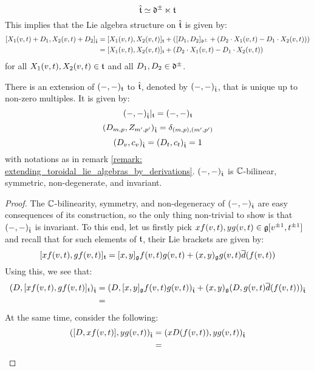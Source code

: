 \begin{remark}
                    $$\hat{\mathfrak{t}} \simeq \mathfrak{d}^{\pm} \ltimes \mathfrak{t}$$
                This implies that the Lie algebra structure on $\hat{\mathfrak{t}}$ is given by:
                    $$
                        \begin{aligned}
                            [ X_1(v, t) + D_1, X_2(v, t) + D_2 ]_{\hat{\t}} & = [X_1(v, t), X_2(v, t)]_{\t} + ( [D_1, D_2]_{\d^{\pm}} + ( D_2 \cdot X_1(v, t) - D_1 \cdot X_2(v, t) ) )
                            \\
                            & = [X_1(v, t), X_2(v, t)]_{\t} + ( D_2 \cdot X_1(v, t) - D_1 \cdot X_2(v, t) )
                        \end{aligned}
                    $$
                for all $X_1(v, t), X_2(v, t) \in \mathfrak{t}$ and all $D_1, D_2 \in \mathfrak{d}^{\pm}$.
            \end{remark}
        \begin{lemma}
            There is an extension of $(-, -)_{\mathfrak{t}}$ to $\hat{\mathfrak{t}}$, denoted by $(-, -)_{\hat{\mathfrak{t}}}$, that is unique up to non-zero multiples. It is given by:
                $$(-, -)_{\hat{\mathfrak{t}}}|_{\mathfrak{t}} = (-, -)_{\mathfrak{t}}$$
                $$(D_{m, p}, Z_{m', p'})_{\hat{\mathfrak{t}}} = \delta_{(m, p), (m', p')}$$
                $$(D_v, c_v)_{\hat{\mathfrak{t}}} = (D_t, c_t)_{\hat{\mathfrak{t}}} = 1$$
            with notations as in remark \ref{remark: extending_toroidal_lie_algebras_by_derivations}. $(-, -)_{\hat{\mathfrak{t}}}$ is $\mathbb{C}$-bilinear, symmetric, non-degenerate, and invariant. 
        \end{lemma}
            \begin{proof}
                The $\mathbb{C}$-bilinearity, symmetry, and non-degeneracy of $(-, -)_{\hat{\mathfrak{t}}}$ are easy consequences of its construction, so the only thing non-trivial to show is that $(-, -)_{\hat{\mathfrak{t}}}$ is invariant. To this end, let us firstly pick $x f(v, t), y g(v, t) \in \mathfrak{g}[v^{\pm 1}, t^{\pm 1}]$ and recall that for such elements of $\mathfrak{t}$, their Lie brackets are given by:
                    $$[x f(v, t), g f(v, t)]_{\mathfrak{t}} = [x, y]_{\mathfrak{g}} f(v, t) g(v, t) + (x, y)_{\mathfrak{g}} g(v, t) \overline{d}(f(v, t))$$
                Using this, we see that:
                    $$
                        \begin{aligned}
                            ( D, [x f(v, t), g f(v, t)]_{\mathfrak{t}} )_{\hat{\mathfrak{t}}} & = ( D, [x, y]_{\mathfrak{g}} f(v, t) g(v, t) )_{\hat{\mathfrak{t}}} + (x, y)_{\mathfrak{g}} ( D, g(v, t) \overline{d}(f(v, t)) )_{\hat{\mathfrak{t}}}
                            \\
                            & = 
                        \end{aligned}
                    $$
                At the same time, consider the following:
                    $$
                        \begin{aligned}
                            ( [D, x f(v, t)], y g(v, t) )_{\hat{\mathfrak{t}}} & = ( x D( f(v, t) ), y g(v, t) )_{\hat{\mathfrak{t}}}
                            \\
                            & = 
                        \end{aligned}
                    $$
            \end{proof}
    
    \printbibliography

